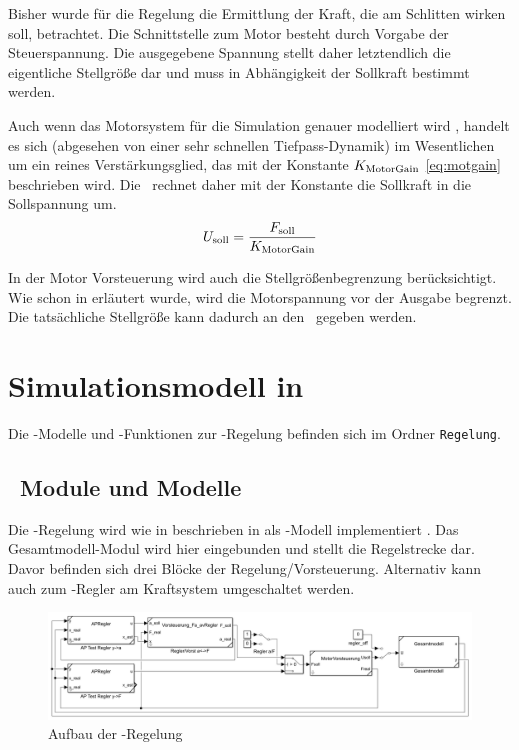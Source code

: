 Bisher wurde für die Regelung die Ermittlung der Kraft, die am Schlitten wirken soll, betrachtet.
Die Schnittstelle zum Motor besteht durch Vorgabe der Steuerspannung.
Die ausgegebene Spannung stellt daher letztendlich die eigentliche Stellgröße dar und muss in Abhängigkeit der Sollkraft bestimmt werden.

Auch wenn das Motorsystem für die Simulation genauer modelliert wird , handelt es sich (abgesehen von einer sehr schnellen Tiefpass-Dynamik) im Wesentlichen um ein reines Verstärkungsglied, das mit der Konstante $K_{\mathrm{MotorGain}}$ \eqref{eq:motgain} beschrieben wird. %
Die \vorst\ rechnet daher mit der Konstante die Sollkraft in die Sollspannung um.
	\[
	U_{\mathrm{soll}}=\frac{F_{\mathrm{soll}}}{K_{\mathrm{MotorGain}}}
\]

In der Motor Vorsteuerung wird auch die Stellgrößenbegrenzung berücksichtigt. 
Wie schon in  erläutert wurde, wird die Motorspannung vor der Ausgabe begrenzt.
Die tatsächliche Stellgröße kann dadurch an den \beob\ gegeben werden.




\section{Simulationsmodell in \Simulink}

Die \sm-Modelle und \ml-Funktionen zur \ap-Regelung befinden sich im Ordner \texttt{Regelung}.

\subsection{\Simulink\ Module und Modelle}

Die \ap-Regelung wird wie in  beschrieben in  als \sm-Modell implementiert .
Das Gesamtmodell-Modul  wird hier eingebunden und stellt die Regelstrecke dar.
Davor befinden sich drei Blöcke der Regelung/Vorsteuerung.
Alternativ kann auch zum \ap-Regler am Kraftsystem umgeschaltet werden.

\begin{figure}[htb]
	\centering
		\includegraphics[width=1.00\textwidth]{Bilder/Simulink/ap_regelung_test ohne outofc.PNG}
	\caption{Aufbau der \ap-Regelung}
	\label{fig:simapr}
\end{figure}

